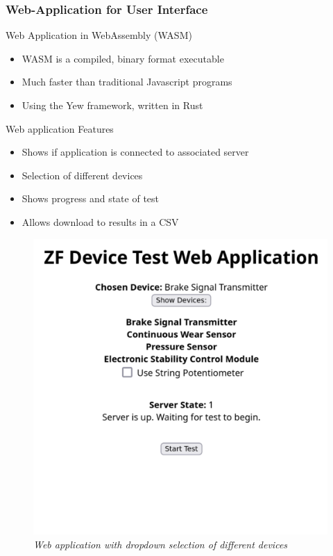 \documentclass[8pt,compress]{beamer}
\begin{document}
\begin{frame}
  \frametitle{Web-Application for User Interface}
  \begin{minipage}{0.5\textwidth}
    \begin{block}{Web Application in WebAssembly (WASM)}
      \begin{itemize}
        \item WASM is a compiled, binary format executable 
        \item Much faster than traditional Javascript programs
        \item Using the Yew framework, written in Rust
      \end{itemize}
    \end{block}
    \begin{block}{Web application Features}
      \begin{itemize}
        \item Shows if application is connected to associated server
        \item Selection of different devices
        \item Shows progress and state of test
        \item Allows download to results in a CSV
      \end{itemize}
    \end{block}
  \end{minipage}
  \hfill
  \begin{minipage}{0.4\textwidth}
    \begin{figure}
      \includegraphics[width=\textwidth]{assets/misc/webapp.png}
      \caption{\it Web application with dropdown selection of different devices}
    \end{figure}
  \end{minipage}
\end{frame}
\end{document}
